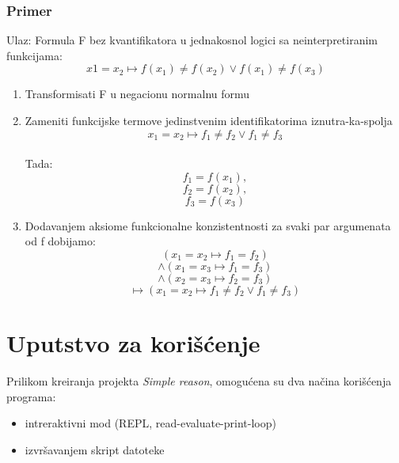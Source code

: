 \documentclass[a4paper]{article}
\begin{document}
\subsubsection*{Primer}
Ulaz: Formula F bez kvantifikatora u jednakosnol logici sa neinterpretiranim funkcijama:
$$x1 = x_2 \mapsto f (x_1) \neq f (x_2) \lor f (x_1) \neq f(x_3)$$
\begin{enumerate}
\item Transformisati F u negacionu normalnu formu 
\item Zameniti funkcijske termove jedinstvenim identifikatorima iznutra-ka-spolja\\

$$x_1 = x_2 \mapsto f_1 \neq f_2 \lor f_1 \neq f_3$$\\
Tada:\\
$$ f_1 = f (x_1),$$ 
$$f_2 = f (x_2),$$
$$f_3 = f (x_3)$$
\item Dodavanjem aksiome funkcionalne konzistentnosti za svaki par argumenata od f dobijamo:
$$(x_1 = x_2 \mapsto f_1 = f_2)$$
$$\land(x_1 = x_3 \mapsto f_1 = f_3)$$
$$\land(x_2 = x_3 \mapsto f_2 = f_3)$$
$$\mapsto (x_1 = x_2 \mapsto f_1 \neq f_2 \lor f_1 \neq f_3)$$
\end{enumerate}

\section{Uputstvo za korišćenje}
\label{sec:uputstvo}
Prilikom kreiranja projekta \textit{Simple reason}, omogućena su dva načina korišćenja programa: 
\begin{itemize}
	\item intreraktivni mod (REPL, read-evaluate-print-loop)
	\item izvršavanjem skript datoteke  
\end{itemize}
\end{document}

